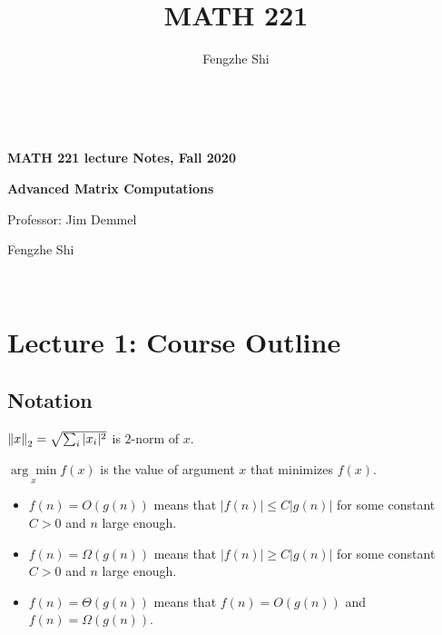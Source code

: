 \documentclass[11pt]{article}
\numberwithin{equation}{section}
\begin{document}
\title{MATH 221}
\author{Fengzhe Shi}
\thispagestyle{empty}
$ $
\vfill
\begin{center}

\centerline{\huge \textbf{MATH 221 lecture Notes, Fall 2020}}
\centerline{\Large \textbf{Advanced Matrix Computations} } 
\centerline{Professor: Jim Demmel}
\centerline{Fengzhe Shi}
\end{center}
\vfill
$ $
\newpage
\thispagestyle{empty}
\tableofcontents
\newpage

\section{Lecture 1: Course Outline}
\subsection{Notation}
\begin{definition}
    $\left\| x \right\|_2 = \sqrt{\sum_i |x_i|^2}$ is $2$-norm of $x$.
\end{definition}
\begin{definition}
    $\underset{x}{\arg \min}f(x)$ is the value of argument $x$ that minimizes $f(x)$.
\end{definition}
\begin{definition}
    \begin{itemize}
        \item $f(n) = O(g(n))$ means that $|f(n)| \leq C|g(n)|$ for some constant $C>0$ and $n$ large enough.
        \item $f(n) = \Omega(g(n))$ means that $|f(n)| \geq C|g(n)|$ for some constant $C>0$ and $n$ large enough.
        \item $f(n) = \Theta(g(n))$ means that $f(n) = O(g(n))$ and $f(n) = \Omega(g(n))$.
    \end{itemize}
\end{definition}
\end{document}
